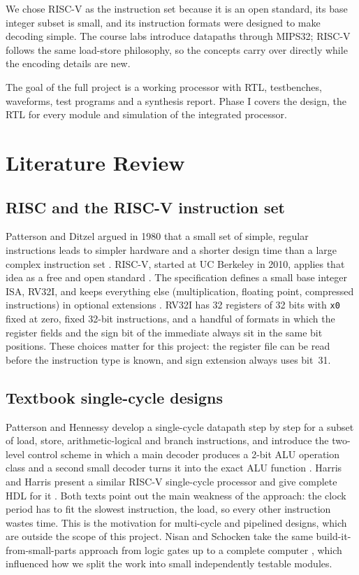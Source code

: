 \documentclass[conference]{IEEEtran}
\begin{document}
We chose RISC-V as the instruction set because it is an open standard, its
base integer subset is small, and its instruction formats were designed to
make decoding simple. The course labs introduce datapaths through MIPS32;
RISC-V follows the same load-store philosophy, so the concepts carry over
directly while the encoding details are new.

The goal of the full project is a working processor with RTL, testbenches,
waveforms, test programs and a synthesis report. Phase I covers the design,
the RTL for every module and simulation of the integrated processor.

\section{Literature Review}

\subsection{RISC and the RISC-V instruction set}
Patterson and Ditzel argued in 1980 that a small set of simple, regular
instructions leads to simpler hardware and a shorter design time than a large
complex instruction set \cite{patterson1980}. RISC-V, started at UC Berkeley
in 2010, applies that idea as a free and open standard \cite{asanovic2014}.
The specification defines a small base integer ISA, RV32I, and keeps
everything else (multiplication, floating point, compressed instructions) in
optional extensions \cite{riscvspec}. RV32I has 32 registers of 32 bits with
\texttt{x0} fixed at zero, fixed 32-bit instructions, and a handful of
formats in which the register fields and the sign bit of the immediate always
sit in the same bit positions. These choices matter for this project: the
register file can be read before the instruction type is known, and sign
extension always uses bit~31.

\subsection{Textbook single-cycle designs}
Patterson and Hennessy develop a single-cycle datapath step by step for a
subset of load, store, arithmetic-logical and branch instructions, and
introduce the two-level control scheme in which a main decoder produces a
2-bit ALU operation class and a second small decoder turns it into the exact
ALU function \cite{patterson2020}. Harris and Harris present a similar
RISC-V single-cycle processor and give complete HDL for it
\cite{harris2021}. Both texts point out the main weakness of the approach:
the clock period has to fit the slowest instruction, the load, so every other
instruction wastes time. This is the motivation for multi-cycle and pipelined
designs, which are outside the scope of this project. Nisan and Schocken take
the same build-it-from-small-parts approach from logic gates up to a complete
computer \cite{nisan2021}, which influenced how we split the work into small
independently testable modules.
\end{document}
